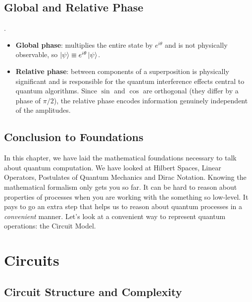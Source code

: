 \documentclass[12pt, a4paper, oneside]{report}
\theoremstyle{plain}
\theoremstyle{definition}
\theoremstyle{remark}
\begin{document}
\section{Global and Relative Phase}.

\begin{itemize}
	\item \textbf{Global phase}: multiplies the entire state by $e^{i\theta}$ and is not
	      physically observable, so $\ket{\psi} \equiv e^{i\theta}\ket{\psi}$.
	\item \textbf{Relative phase}: between components of a superposition is physically
	      significant and is responsible for the quantum interference effects central to quantum algorithms.
	      Since $\sin$ and $\cos$ are orthogonal (they differ by a phase of $\pi/2$), the
	      relative phase encodes information genuinely independent of the amplitudes.
\end{itemize}



\section{Conclusion to Foundations}
In this chapter, we have laid the mathematical foundations necessary to talk about quantum computation. We have looked at Hilbert Spaces, Linear Operators, Postulates of Quantum Mechanics and Dirac Notation. Knowing the mathematical formalism only gets you so far. It can be hard to reason about properties of processes when you are working with the something so low-level. It pays to go an extra step that helps us to reason about quantum processes in a \emph{convenient} manner. Let's look at a convenient way to represent quantum operations: the Circuit Model.


\chapter{Circuits}
\label{ch:circuit-foundations}

\section{Circuit Structure and Complexity}
\end{document}
